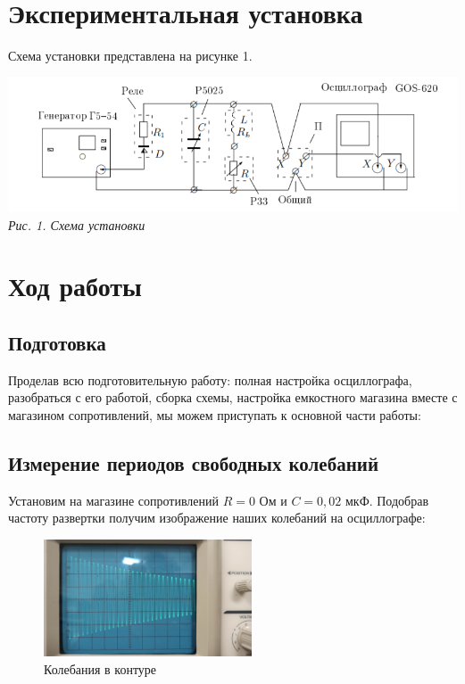 \documentclass[a4paper, 12pt]{article}%
\begin{document}
\section{Экспериментальная установка}

Схема установки представлена на рисунке 1.

\begin{center}

    \includegraphics[scale=0.6]{324_scheme.png} \\
    \textit{Рис. 1. Схема установки}

\end{center}

\section{Ход работы}

\subsection{Подготовка}

Проделав всю подготовительную работу: полная настройка осциллографа, разобраться с его работой, сборка схемы, настройка емкостного магазина вместе с магазином сопротивлений, мы можем приступать к основной части работы:


\subsection{Измерение периодов свободных колебаний}

Установим на магазине сопротивлений $R = 0$ Ом и $C = 0,02$ мкФ. Подобрав частоту развертки получим изображение наших колебаний на осциллографе:


\begin{figure}[h!]
\begin{center}
\includegraphics[width = 0.55\textwidth]{my1.jpg}
\caption{Колебания в контуре}
\end{center}
\end{figure}
\end{document}
